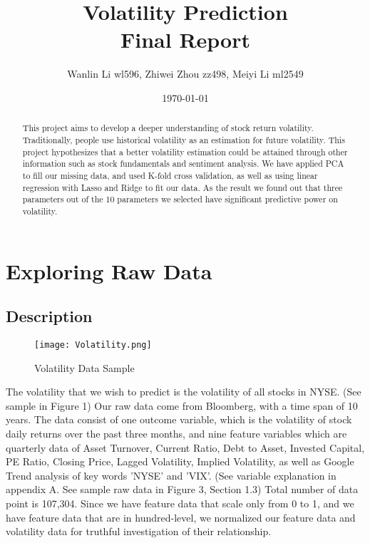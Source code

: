 \documentclass[b4paper]{article}
\title{Volatility Prediction\\Final Report}
\author{Wanlin Li wl596, Zhiwei Zhou zz498, Meiyi Li ml2549}
\date{\today}
\begin{document}
\maketitle  

\begin{abstract}
This project aims to develop a deeper understanding of stock return volatility. Traditionally, people use historical volatility as an estimation for future volatility. This project hypothesizes that a better volatility estimation could be attained through other information such as stock fundamentals and sentiment analysis. We have applied PCA to fill our missing data, and used K-fold cross validation, as well as using linear regression with Lasso and Ridge to fit our data. As the result we found out that three parameters out of the 10 parameters we selected have significant predictive power on volatility.
\end{abstract}

\section{Exploring Raw Data}
\label{sec:introduction}

\subsection{Description}

\begin{figure}[h]
\centering
\texttt{[image: Volatility.png]}
\caption{\label{fig:scatter plot}Volatility Data Sample}
\end{figure}

The volatility that we wish to predict is the volatility of all stocks in NYSE. (See sample in Figure 1) Our raw data come from Bloomberg, with a time span of 10 years. The data consist of one outcome variable, which is the volatility of stock daily returns over the past three months, and nine feature variables which are quarterly data of Asset Turnover, Current Ratio, Debt to Asset, Invested Capital, PE Ratio, Closing Price, Lagged Volatility, Implied Volatility, as well as Google Trend analysis of key words 'NYSE' and 'VIX'. (See variable explanation in appendix A. See sample raw data in Figure 3, Section 1.3) Total number of data point is 107,304. Since we have feature data that scale only from 0 to 1, and we have feature data that are in hundred-level, we normalized our feature data and volatility data for truthful investigation of their relationship. 
\end{document}
